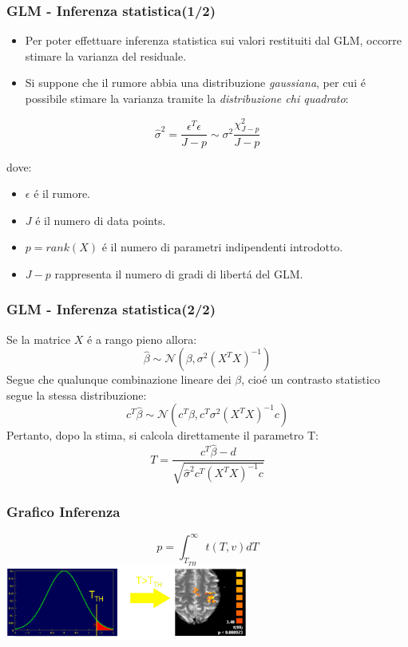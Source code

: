 \documentclass{beamer}
\begin{document}
\begin{frame}
\frametitle{GLM - Inferenza statistica(1/2)}

\begin{itemize}
\item Per poter effettuare inferenza statistica sui valori restituiti dal GLM, occorre stimare la \alert{varianza del residuale}.
\item Si suppone che il rumore abbia una distribuzione \emph{gaussiana}, per cui \'e possibile stimare la varianza tramite la \emph{distribuzione chi quadrato}:
\end{itemize}
 
$$\hat{\sigma}^2 = \frac{\epsilon^T\epsilon}{J - p} \sim \sigma^2 \frac{\chi^2_{J-p}}{J-p}$$

dove: 
\begin{itemize}
\item $\epsilon$ \'e il rumore.
\item $J$ \'e il numero di data points.
\item $p = rank(X) $ \'e il numero di parametri indipendenti introdotto.
\item $J-p$ rappresenta il numero di \alert{gradi di libert\'a} del GLM.
\end{itemize}
\end{frame}

\begin{frame}
\frametitle{GLM - Inferenza statistica(2/2)}
Se la matrice $X$ \'e a rango pieno allora:
$$\hat{\beta} \sim \mathcal{N}(\beta, \sigma^2(X^TX)^{-1})$$
Segue che qualunque combinazione lineare dei $\beta$, cio\'e un \alert{contrasto statistico} segue la stessa distribuzione:
$$c^T\hat{\beta} \sim \mathcal{N}(c^T\beta, c^T\sigma^2(X^TX)^{-1}c)$$
Pertanto, dopo la stima, si calcola direttamente il parametro T:
$$T = \frac{c^T\hat{\beta} - d}{\sqrt{\hat{\sigma}^2c^T(X^TX)^{-1}c}}$$
\end{frame}

\begin{frame}
\frametitle{Grafico Inferenza}
$$p = \int_{T_{TH}}^{\infty} t(T,v)dT$$
\includegraphics[keepaspectratio, width=300px]{Images/stats.png}
\end{frame}
\end{document}
